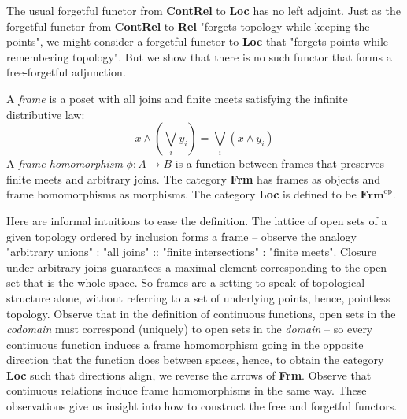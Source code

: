 The usual forgetful functor from \textbf{ContRel} to \textbf{Loc} has no left adjoint. Just as the forgetful functor from \textbf{ContRel} to \textbf{Rel} "forgets topology while keeping the points", we might consider a forgetful functor to \textbf{Loc} that "forgets points while remembering topology". But we show that there is no such functor that forms a free-forgetful adjunction.

\begin{rem}\citep{nlabauthorsLocNLab}
A \emph{frame} is a poset with all joins and finite meets satisfying the infinite distributive law:
\[x \wedge (\bigvee\limits_{i}y_i) = \bigvee\limits_{i}(x \wedge y_i)\]
A \emph{frame homomorphism} $\phi: A \rightarrow B$ is a function between frames that preserves finite meets and arbitrary joins. The category \textbf{Frm} has frames as objects and frame homomorphisms as morphisms. The category \textbf{Loc} is defined to be $\textbf{Frm}^\text{op}$.
\end{rem}

\begin{remark}
Here are informal intuitions to ease the definition. The lattice of open sets of a given topology ordered by inclusion forms a frame -- observe the analogy "arbitrary unions" : "all joins" :: "finite intersections" : "finite meets". Closure under arbitrary joins guarantees a maximal element corresponding to the open set that is the whole space. So frames are a setting to speak of topological structure alone, without referring to a set of underlying points, hence, pointless topology. Observe that in the definition of continuous functions, open sets in the \emph{codomain} must correspond (uniquely) to open sets in the \emph{domain} -- so every continuous function induces a frame homomorphism going in the opposite direction that the function does between spaces, hence, to obtain the category \textbf{Loc} such that directions align, we reverse the arrows of \textbf{Frm}. Observe that continuous relations induce frame homomorphisms in the same way. These observations give us insight into how to construct the free and forgetful functors.
\end{remark}

